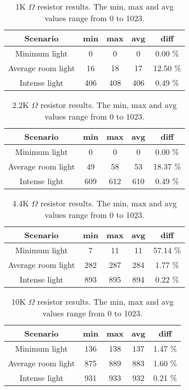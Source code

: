 \begin{table}[htbp]
  \centering
  \begin{tabular}{c c c c c}
    \toprule
    Scenario & min & max & avg & diff \\ \midrule
    Minimum light & 0 & 0 & 0 & 0.00 \% \\
    Average room light & 16 & 18 & 17 & 12.50 \% \\
    Intense light & 406 & 408 & 406 & 0.49 \% \\ \bottomrule
  \end{tabular}
  \caption{1K $\Omega$ resistor results. The min, max and avg values range from 0 to 1023.}\label{tab:1KTestResults}
\end{table}

\begin{table}[htbp]
  \centering
  \begin{tabular}{c c c c c}
    \toprule
    Scenario & min & max & avg & diff \\ \midrule
    Minimum light & 0 & 0 & 0 & 0.00 \% \\
    Average room light & 49 & 58 & 53 & 18.37 \% \\
    Intense light & 609 & 612 & 610 & 0.49 \% \\ \bottomrule
  \end{tabular}
  \caption{2.2K $\Omega$ resistor results. The min, max and avg values range from 0 to 1023.}\label{tab:2.2KTestResults}
\end{table}

\begin{table}[htbp]
  \centering
  \begin{tabular}{c c c c c}
    \toprule
    Scenario & min & max & avg & diff \\ \midrule
    Minimum light & 7 & 11 & 11 & 57.14 \% \\
    Average room light & 282 & 287 & 284 & 1.77 \% \\
    Intense light & 893 & 895 & 894 & 0.22 \% \\ \bottomrule
  \end{tabular}
  \caption{4.4K $\Omega$ resistor results. The min, max and avg values range from 0 to 1023.}\label{tab:4.4KTestResults}
\end{table}

\begin{table}[htbp]
  \centering
  \begin{tabular}{c c c c c}
    \toprule
    Scenario & min & max & avg & diff \\ \midrule
    Minimum light & 136 & 138 & 137 & 1.47 \% \\
    Average room light & 875 & 889 & 883 & 1.60 \% \\
    Intense light & 931 & 933 & 932 & 0.21 \% \\ \bottomrule
  \end{tabular}
  \caption {10K $\Omega$ resistor results. The min, max and avg values range from 0 to 1023.}\label{tab:10KTestResults}
\end{table}

